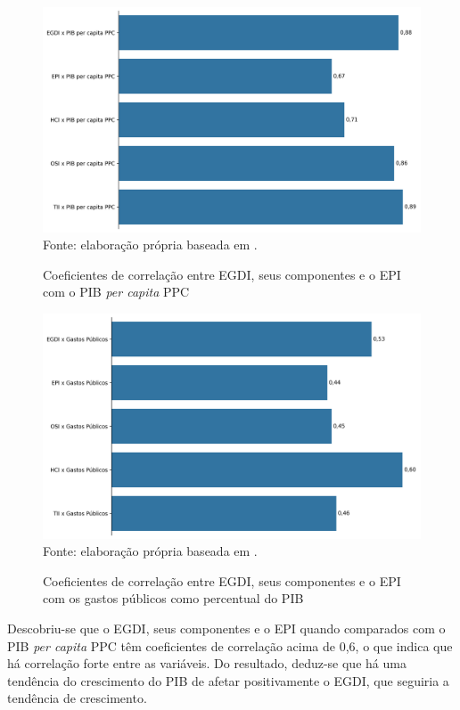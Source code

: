 \begin{figure}[H]
	\centering
	\caption{Coeficientes de correlação entre EGDI, seus componentes e o EPI com o PIB \textit{per capita} PPC}
	\includegraphics[width=1\linewidth]{figuras/correlacao_egdi_pibpercapitapcc.png}
	\label{fig:correlacao_egdi_pibpercapitapcc}
	\footnotesize{Fonte: elaboração própria baseada em \cite{WB_pib_per_capita_países}.}
\end{figure}

\begin{figure}[H]
	\centering
	\caption{Coeficientes de correlação entre EGDI, seus componentes e o EPI com os gastos públicos como percentual do PIB}
    \includegraphics[width=1\linewidth]{figuras/correlacao_egdi_gastospublicos.png}
	\label{fig:correlacao_egdi_gastospublicos}
	\footnotesize{Fonte: elaboração própria baseada em \cite{FMI_gov_expenditure}.}
\end{figure}

Descobriu-se que o EGDI, seus componentes e o EPI quando comparados com o PIB \textit{per capita} PPC têm coeficientes de correlação acima de 0,6, o que indica que há correlação forte entre as variáveis. Do resultado, deduz-se que há uma tendência do crescimento do PIB de afetar positivamente o EGDI, que seguiria a tendência de crescimento.

